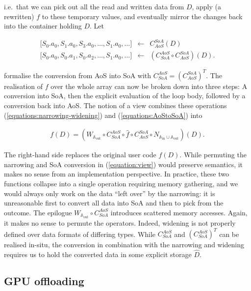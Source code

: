 \noindent
i.e.~that we can pick out all the read and written data from $D$, apply (a rewritten) $f$ to these temporary values, and eventually mirror the changes back into the container holding $D$.
Let

\begin{eqnarray}
  \lbrack S_0.a_0, S_1.a_0, S_3.a_0, \ldots , S_1.a_0, \ldots \rbrack 
    & \gets & 
    C_{AoS}^{SoA}( D ) 
    \label{equations:AoStoSoA}
    \\
  \lbrack S_0.a_0,S_0.a_1,S_0.a_2,\ldots,S_1.a_0,\ldots \rbrack 
    & \gets & (C_{SoA}^{AoS} \circ C_{AoS}^{SoA})( D ). \nonumber 
\end{eqnarray}


\noindent
formalise the conversion from AoS into SoA with 
$ C_{SoA}^{AoS} = \left( C_{AoS}^{SoA} \right)^T$.
The realisation of $f$ over the whole array can now be broken down into three steps:
A conversion into SoA, then the explicit evaluation of the loop body, followed by a conversion back into AoS.
The notion of a view combines these operations (\ref{equations:narrowing-widening}) and (\ref{equations:AoStoSoA}) into

\begin{eqnarray}
  f(D) = \left( W_{\mathbb{A}_{\text{out}}} \circ C_{SoA}^{AoS} \circ \hat f \circ C_{AoS}^{SoA} \circ N_{\mathbb{A}_{\text{in}} \cup \mathbb{A}_{\text{out}}} \right) (D).
  \label{equation:view}
\end{eqnarray}
  


\noindent
The right-hand side replaces the original user code $f(D)$.
While permuting the narrowing and SoA conversion in (\ref{equation:view}) would preserve semantics, it makes no sense from an implementation perspective.
In practice, these two functions collapse into a single operation requiring memory gathering, and we would always only work on the data ``left over'' by the narrowing:
it is unreasonable first to convert all data into SoA and then to pick from the outcome.
The epilogue $W_{\mathbb{A}_{\text{out}}} \circ C_{SoA}^{AoS}$ introduces scattered memory accesses.
Again, it makes no sense to permute the operators.
Indeed, widening is not properly defined over data formats of differing types.
While $C_{SoA}^{AoS}$ and $\left( C_{SoA}^{AoS} \right) ^T$ can be realised in-situ, the conversion in combination with the narrowing and widening requires us to hold the converted data in some explicit storage $\hat D$.


\subsection{GPU offloading}

